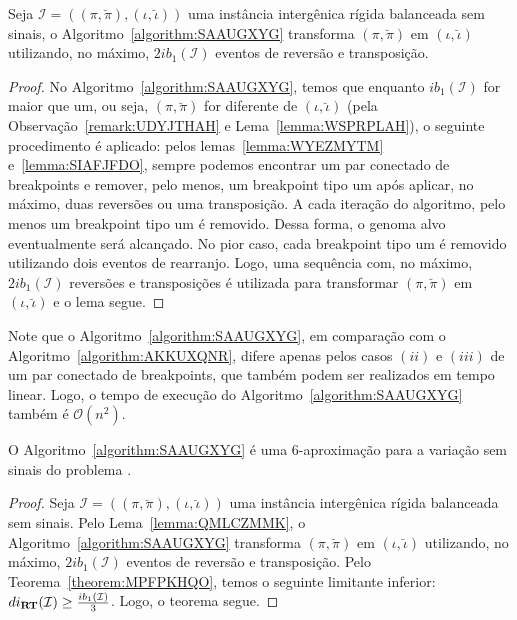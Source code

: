 \begin{lemma}\label{lemma:QMLCZMMK}
Seja $\mathcal{I} = ((\pi,\breve\pi),(\iota,\breve\iota))$ uma instância intergênica rígida balanceada sem sinais, o Algoritmo~\ref{algorithm:SAAUGXYG} transforma $(\pi,\breve\pi)$ em $(\iota,\breve\iota)$ utilizando, no máximo, $2ib_1(\mathcal{I})$ eventos de reversão e transposição.
\end{lemma}
\begin{proof}
  No Algoritmo~\ref{algorithm:SAAUGXYG}, temos que enquanto $ib_1(\mathcal{I})$ for maior que um, ou seja, $(\pi,\breve\pi)$ for diferente de $(\iota,\breve\iota)$ (pela Observação~\ref{remark:UDYJTHAH} e Lema~\ref{lemma:WSPRPLAH}), o seguinte procedimento é aplicado: pelos lemas~\ref{lemma:WYEZMYTM} e~\ref{lemma:SIAFJFDO}, sempre podemos encontrar um par conectado de breakpoints e remover, pelo menos, um breakpoint tipo um após aplicar, no máximo, duas reversões ou uma transposição. A cada iteração do algoritmo, pelo menos um breakpoint tipo um é removido. Dessa forma, o genoma alvo eventualmente será alcançado. No pior caso, cada breakpoint tipo um é removido utilizando dois eventos de rearranjo. Logo, uma sequência com, no máximo, $2ib_1(\mathcal{I})$ reversões e transposições é utilizada para transformar $(\pi,\breve\pi)$ em $(\iota,\breve\iota)$ e o lema segue.
\end{proof}

Note que o Algoritmo~\ref{algorithm:SAAUGXYG}, em comparação com o Algoritmo~\ref{algorithm:AKKUXQNR}, difere apenas pelos casos $(ii)$ e $(iii)$ de um par conectado de breakpoints, que também podem ser realizados em tempo linear. Logo, o tempo de execução do Algoritmo~\ref{algorithm:SAAUGXYG} também é $\mathcal{O}(n^2)$.

\begin{theorem}\label{theorem:ZEFRNBIE}
O Algoritmo~\ref{algorithm:SAAUGXYG} é uma $6$-aproximação para a variação sem sinais do problema \SbIRT{}.
\end{theorem}
\begin{proof}
Seja $\mathcal{I} = ((\pi,\breve\pi),(\iota,\breve\iota))$ uma instância intergênica rígida balanceada sem sinais. Pelo Lema~\ref{lemma:QMLCZMMK}, o Algoritmo~\ref{algorithm:SAAUGXYG} transforma $(\pi,\breve\pi)$ em $(\iota,\breve\iota)$ utilizando, no máximo, $2ib_1(\mathcal{I})$ eventos de reversão e transposição. Pelo Teorema~\ref{theorem:MPFPKHQO}, temos o seguinte limitante inferior: $di_{\textbf{RT}}(\mathcal{I}) \ge \frac{ib_1(\mathcal{I})}{3}$. Logo, o teorema segue. 
\end{proof}

